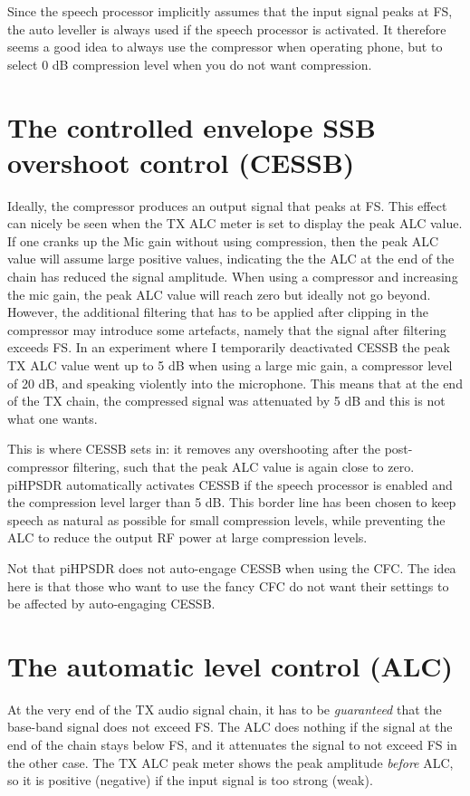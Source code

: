 \documentclass[12pt]{book}
\def\pH{pi\-HPSDR\xspace}
\begin{document}
Since the speech processor implicitly assumes that the input signal peaks at FS, the auto leveller is
always used if the speech processor is activated. It therefore seems a good idea to always use the
compressor when operating phone, but to select 0 dB compression level when you do not want compression.

\section{The controlled envelope SSB overshoot control (CESSB)}
Ideally, the compressor produces an output signal that peaks at FS. This effect can nicely be seen
when the TX ALC meter is set to display the peak ALC value. If one cranks up the Mic gain without
using compression, then the peak ALC value will assume large positive values, indicating the the
ALC at the end of the chain has reduced the signal amplitude. When using a compressor and increasing
the mic gain, the peak ALC value will reach zero but ideally not go beyond. However,
the additional filtering that has to be applied after clipping in the compressor may
introduce some artefacts, namely that the signal after filtering exceeds FS. In an experiment where
I temporarily deactivated CESSB the peak TX ALC value went up to 5 dB when using a large mic gain,
a compressor level of 20 dB, and speaking violently into the microphone. This means that at the
end of the TX chain, the compressed signal was attenuated by 5 dB and this is not what one wants.

This is where CESSB sets in: it removes any overshooting after the post-compressor filtering,
such that the peak ALC value is again close to zero.
 \pH automatically activates CESSB if the
speech processor is enabled and the compression level larger than 5 dB. This border line has been chosen
to keep speech as natural as possible for small compression levels, while preventing the ALC to
reduce the output RF power at large compression levels.

Not that \pH does not auto-engage CESSB when using the CFC. The idea here is that those who want
to use the fancy CFC do not want their settings to be affected by auto-engaging CESSB.

\section{The automatic level control (ALC)}

At the very end of the TX audio signal chain, it has to be \textit{guaranteed} that the base-band
signal does not exceed FS. The ALC does nothing if the signal at the end of the chain stays below FS,
and it attenuates the signal to not exceed FS in the other case. The TX ALC peak meter shows the
peak amplitude \textit{before} ALC, so it is positive (negative) if the input signal is too strong
(weak).
\end{document}
